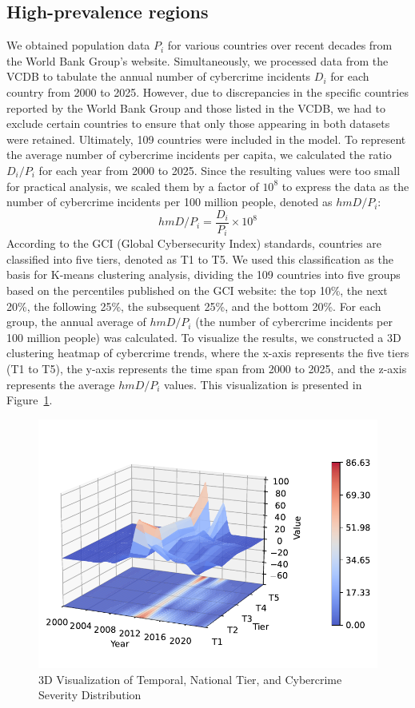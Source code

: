 \subsection{High-prevalence regions}\label{subsec:high-prevalence-regions} %
	We obtained population data $P_i$ for various countries over recent decades from the World Bank Group's website\cite{population}.
	Simultaneously, we processed data from the VCDB to tabulate the annual number of cybercrime incidents $D_i$ for each country from 2000 to 2025.
	However, due to discrepancies in the specific countries reported by the World Bank Group and those listed in the VCDB,
	we had to exclude certain countries to ensure that only those appearing in both datasets were retained.
	Ultimately, 109 countries were included in the model.
	To represent the average number of cybercrime incidents per capita,
	we calculated the ratio $D_i/P_i$ for each year from 2000 to 2025.
	Since the resulting values were too small for practical analysis,
	we scaled them by a factor of $10^{8}$ to express the data as the number of cybercrime incidents per 100 million people,
	denoted as $hmD/P_i$:
	\begin{equation}
		hmD/P_i = \frac{D_i}{P_i} \times 10^{8}\label{eq:3-2}
	\end{equation}
	According to the GCI (Global Cybersecurity Index) standards, countries are classified into five tiers, denoted as T1 to T5.
	We used this classification as the basis for K-means clustering analysis,
	dividing the 109 countries into five groups based on the percentiles published on the GCI website:
	the top 10\%, the next 20\%, the following 25\%, the subsequent 25\%, and the bottom 20\%.
	For each group, the annual average of $hmD/P_i$ (the number of cybercrime incidents per 100 million people) was calculated.
	To visualize the results, we constructed a 3D clustering heatmap of cybercrime trends,
	where the x-axis represents the five tiers (T1 to T5),
	the y-axis represents the time span from 2000 to 2025,
	and the z-axis represents the average $hmD/P_i$ values.
	This visualization is presented in Figure~\ref{fig:3D_with_Spaced_Projection}.
	\begin{figure}[htb]
		\centering
		\includegraphics[width=0.75\linewidth]{../rsrc/distributions/3D_with_Spaced_Projection}
		\caption{3D Visualization of Temporal, National Tier, and Cybercrime Severity Distribution}\label{fig:3D_with_Spaced_Projection}
	\end{figure}
